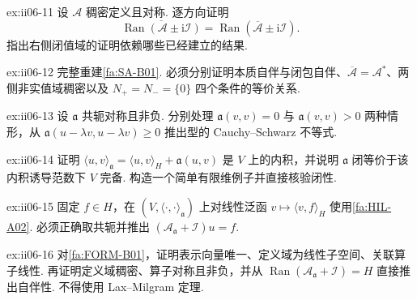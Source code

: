 \begin{FAExercise}[闭包与值域闭包]{ex:ii06-11}
设 \(\displaystyle\mathcal A\) 稠密定义且对称. 逐方向证明
\[
\overline{\operatorname{Ran}(\mathcal A\pm\mathrm{i}\mathcal I)}
=
\operatorname{Ran}(\overline{\mathcal A}\pm\mathrm{i}\mathcal I).
\]
指出右侧闭值域的证明依赖哪些已经建立的结果.
\end{FAExercise}

\begin{FAExercise}{ex:ii06-12}
完整重建\autoref{fa:SA-B01}. 必须分别证明本质自伴与闭包自伴、\(\displaystyle\overline{\mathcal A}=\mathcal A^*\)、两侧非实值域稠密以及 \(\displaystyle N_+=N_-=\{0\}\) 四个条件的等价关系.
\end{FAExercise}

\begin{FAExercise}{ex:ii06-13}
设 \(\displaystyle\mathfrak a\) 共轭对称且非负. 分别处理 \(\displaystyle\mathfrak a(v,v)=0\) 与 \(\displaystyle\mathfrak a(v,v)>0\) 两种情形，从 \(\displaystyle\mathfrak a(u-\lambda v,u-\lambda v)\geqslant0\) 推出型的 Cauchy--Schwarz 不等式.
\end{FAExercise}

\begin{FAExercise}[闭型与型范数]{ex:ii06-14}
证明 \(\displaystyle\langle u,v\rangle_{\mathfrak a}=\langle u,v\rangle_H+\mathfrak a(u,v)\) 是 \(\displaystyle V\) 上的内积，并说明 \(\displaystyle\mathfrak a\) 闭等价于该内积诱导范数下 \(\displaystyle V\) 完备. 构造一个简单有限维例子并直接核验闭性.
\end{FAExercise}

\begin{FAExercise}{ex:ii06-15}
固定 \(\displaystyle f\in H\)，在 \(\displaystyle(V,\langle\cdot,\cdot\rangle_{\mathfrak a})\) 上对线性泛函 \(\displaystyle v\mapsto\langle v,f\rangle_H\) 使用\autoref{fa:HIL-A02}. 必须正确取共轭并推出 \(\displaystyle(\mathcal A_{\mathfrak a}+\mathcal I)u=f\).
\end{FAExercise}

\begin{FAExercise}[关联算子的定义域与自伴性]{ex:ii06-16}
对\autoref{fa:FORM-B01}，证明表示向量唯一、定义域为线性子空间、关联算子线性. 再证明定义域稠密、算子对称且非负，并从 \(\displaystyle\operatorname{Ran}(\mathcal A_{\mathfrak a}+\mathcal I)=H\) 直接推出自伴性. 不得使用 Lax--Milgram 定理.
\end{FAExercise}

